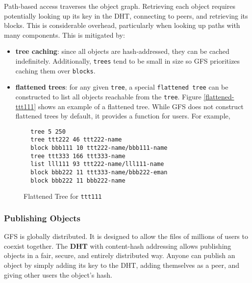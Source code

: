 \documentclass{sig-alternate}
\begin{document}
Path-based access traverses the object graph. Retrieving
each object requires potentially looking up its key in the DHT,
connecting to peers, and retrieving its blocks. This is considerable
overhead, particularly when looking up paths with many components.
This is mitigated by:
\begin{itemize}
  \item \textbf{tree caching}: since all objects are hash-addressed, they
        can be cached indefinitely. Additionally, \texttt{trees} tend to be
        small in size so GFS prioritizes caching them over \texttt{blocks}.
  \item \textbf{flattened trees}: for any given \texttt{tree}, a special
        \texttt{flattened tree} can be constructed to list all objects
        reachable from the \texttt{tree}. Figure \ref{flattened-ttt111} shows
        an example of a flattened tree. While GFS does not construct flattened
        trees by default, it provides a function for users. For example,
\end{itemize}

\begin{figure}
\begin{verbatim}
  tree 5 250
  tree ttt222 46 ttt222-name
  block bbb111 10 ttt222-name/bbb111-name
  tree ttt333 166 ttt333-name
  list lll111 93 ttt222-name/lll111-name
  block bbb222 11 ttt333-name/bbb222-eman
  block bbb222 11 bbb222-name
\end{verbatim}
\caption{Flattened Tree for \texttt{ttt111}} \label{fig:flattened-ttt111}
\end{figure}


\subsubsection{Publishing Objects}

GFS is globally distributed. It is designed to allow the files of millions
of users to coexist together. The \textbf{DHT} with content-hash addressing
allows publishing objects in a fair, secure, and entirely distributed way.
Anyone can publish an object by simply adding its key to the DHT, adding
themselves as a peer, and giving other users the object's hash.
\end{document}
